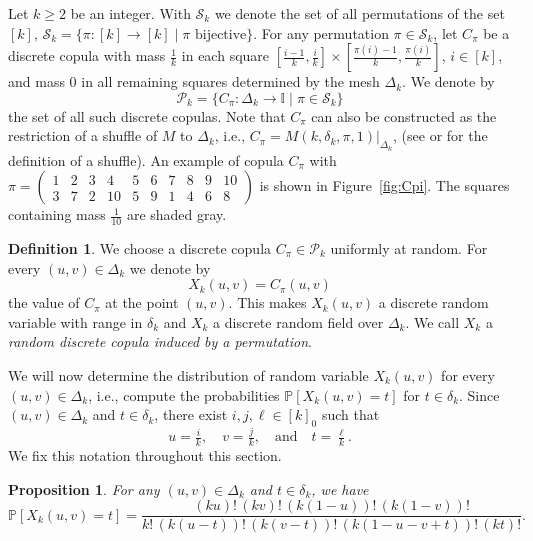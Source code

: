 \documentclass[12pt,a4paper]{amsart}
\newtheorem{proposition}[theorem]{Proposition}
\theoremstyle{definition}
\newtheorem{definition}[theorem]{Definition}
\newcommand{\II}{\mathbb{I}}
\newcommand{\dk}{\delta_k}
\newcommand{\DK}{\Delta_k}
\newcommand{\SK}{\mathcal{S}_k}
\newcommand{\PK}{\mathcal{P}_k}
\newcommand{\PP}{\mathbb{P}}
\begin{document}
Let $k \ge 2$ be an integer. With $\SK$ we denote the set of all permutations of the set $[k]$, $\SK= \{ \pi \colon [k] \to [k] \mid  \pi \text{ bijective} \}$.
For any permutation $\pi \in \SK$, let $C_\pi$ be a discrete copula with mass $\frac{1}{k}$ in each square $[\frac{i-1}{k},\frac{i}{k}] \times [\frac{\pi(i)-1}{k},\frac{\pi(i)}{k}]$, $i \in [k]$, and mass $0$ in all remaining squares determined by the mesh $\DK$. We denote by
\begin{equation}\label{eq:P_k}
    \PK=\{ C_\pi \colon \DK \to \II \mid \pi \in \SK \}
\end{equation}
the set of all such discrete copulas. Note that $\displaystyle C_\pi$ can also be constructed as the restriction of a shuffle of $M$ to $\DK$, i.e., $\displaystyle C_\pi = M(k,\dk, \pi, 1)\big|_{\DK}$, (see \cite[\S 3.2.3]{Nel06} or \cite{KoBuMo22} for the definition of a shuffle). An example of copula $C_\pi$ with $\pi =  \left(\begin{smallmatrix}
       1 & 2 & 3 & 4 & 5 & 6 & 7 & 8 & 9 & 10 \\
       3 & 7 & 2 & 10 & 5 & 9 & 1 & 4 & 6 & 8
   \end{smallmatrix}\right)$ is shown in Figure~\ref{fig:Cpi}. The squares containing mass $\frac{1}{10}$ are shaded gray.

\begin{definition}
We choose a discrete copula $C_\pi\in \PK$ uniformly at random. For every $(u,v) \in \DK$ we denote by
$$X_k(u,v)=C_\pi(u,v)$$
the value of $C_\pi$ at the point $(u,v)$. This makes $X_k(u,v)$ a discrete random variable with range in $\dk$ and $X_k$ a discrete random field over $\DK$. We call $X_k$ a \emph{random discrete copula induced by a permutation}.      
\end{definition}

We will now determine the distribution of random variable $X_k(u,v)$ for every $(u,v) \in \DK$, i.e., compute the probabilities $\PP[X_k(u,v)= t]$ for $t \in \dk$. 
Since $(u,v) \in \DK$ and $t \in \dk$, there exist $i,j, \ell\in [k]_0$ such that 
$$u=\tfrac{i}{k},  \quad v=\tfrac{j}{k}, \quad \text{and} \quad t= \tfrac{\ell}{k}.$$ 
We fix this notation throughout this section. 


\begin{proposition}\label{pr:3.2}
    For any $(u,v) \in \DK$ and $t \in \dk$, we have 
    \begin{equation} \label{eq:pxk=t}
        \PP[X_k(u,v)=t] = \frac{(ku)! \, (kv)! \, (k(1-u))! \, (k(1-v))!}{k! \, (k(u-t))! \, (k(v-t))! \, (k(1-u-v+t))! \, (kt)!}.
    \end{equation} 
\end{proposition}
\end{document}
